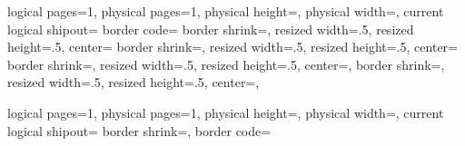 {%
  \edef\pgfpageoptionheight{\the\paperheight}
  \edef\pgfpageoptionwidth{\the\paperwidth}
  \def\pgfpageoptionborder{0pt}
  \def\pgfpageoptionfirstshipout{1}
  \def\pgfpageoptionbordercode{}
}%
{%
  \pgfpagesphysicalpageoptions
  {%
    logical pages=1,%
    physical pages=1,%
    physical height=\pgfpageoptionheight,%
    physical width=\pgfpageoptionwidth,%
    current logical shipout=\pgfpageoptionfirstshipout%
  }
  \pgfpagessetdefaults
  {%
    border code=\pgfpageoptionbordercode
  }
    {%
      border shrink=\pgfpageoptionborder,%
      resized width=.5\pgfphysicalwidth,%
      resized height=.5\pgfphysicalheight,%
      center=\pgfpoint{.25\pgfphysicalwidth}{.75\pgfphysicalheight}%
    }%
    {%
      border shrink=\pgfpageoptionborder,%
      resized width=.5\pgfphysicalwidth,%
      resized height=.5\pgfphysicalheight,%
      center=\pgfpoint{.75\pgfphysicalwidth}{.75\pgfphysicalheight}%
    }%
    {%
      border shrink=\pgfpageoptionborder,%
      resized width=.5\pgfphysicalwidth,%
      resized height=.5\pgfphysicalheight,%
      center=\pgfpoint{.25\pgfphysicalwidth}{.25\pgfphysicalheight},%
    }%
    {%
      border shrink=\pgfpageoptionborder,%
      resized width=.5\pgfphysicalwidth,%
      resized height=.5\pgfphysicalheight,%
      center=\pgfpoint{.75\pgfphysicalwidth}{.25\pgfphysicalheight},%
    }%
}

%
{%
  \edef\pgfpageoptionheight{\the\paperwidth}
  \edef\pgfpageoptionwidth{\the\paperheight}
  \def\pgfpageoptionborder{0pt}
  \def\pgfpageoptionfirstshipout{1}
  \def\pgfpageoptionbordercode{}
}%
{%
  \pgfpagesphysicalpageoptions
  {%
    logical pages=1,%
    physical pages=1,%
    physical height=\pgfpageoptionheight,%
    physical width=\pgfpageoptionwidth,%
    current logical shipout=\pgfpageoptionfirstshipout%
  }
  \pgfpagessetdefaults
  {%
    border shrink=\pgfpageoptionborder,%
    border code=\pgfpageoptionbordercode
  }
  \ifdim\paperheight>\paperwidth\relax
  \pgfpageslogicalpageoptions{1}
  {%
    resized width=.5\pgfphysicalwidth,%
    resized height=\pgfphysicalheight,%
    center=\pgfpoint{.25\pgfphysicalwidth}{.5\pgfphysicalheight},%
  }
  \pgfpageslogicalpageoptions{1}
  {%
    resized width=.5\pgfphysicalwidth,%
    resized height=\pgfphysicalheight,%
    center=\pgfpoint{.75\pgfphysicalwidth}{.5\pgfphysicalheight},%
  }
  \else
  \pgfpageslogicalpageoptions{1}
  {%
    resized width=\pgfphysicalwidth,%
    resized height=.5\pgfphysicalheight,%
    center=\pgfpoint{.5\pgfphysicalwidth}{.75\pgfphysicalheight},%
  }
  \pgfpageslogicalpageoptions{1}
  {%
    resized width=\pgfphysicalwidth,%
    resized height=.5\pgfphysicalheight,%
    center=\pgfpoint{.5\pgfphysicalwidth}{.25\pgfphysicalheight},%
  }
  \fi
}

